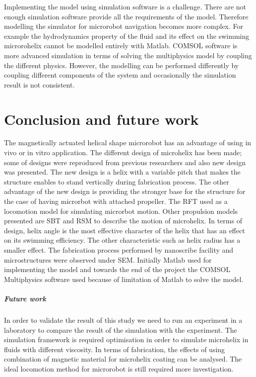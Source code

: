 \documentclass[12pt,a4paper,titlepage]{report}
\begin{document}
Implementing the model using simulation software is a challenge. There are not enough simulation 
software provide all the requirements of the model. Therefore modelling the simulator for microrobot
 navigation becomes more complex. For example the hydrodynamics property of the fluid and its 
effect on the swimming microrohelix cannot be modelled entirely with Matlab. COMSOL software 
is more advanced simulation in terms of solving the multiphysics model by coupling the different 
physics. However, the modelling can be performed differently by coupling different components 
of the system and occasionally the simulation result is not consistent.  












\chapter{Conclusion and future work}

The magnetically actuated helical shape microrobot  has an advantage of using in vivo or in 
vitro application. The different design of microhelix has been made; some of designs were 
reproduced from previous researchers and also new design was presented. The new design 
is a helix with a variable pitch that makes the structure enables to stand vertically during fabrication 
process. 
The other advantage of the new design is providing the stronger base for the structure for the case
 of having microrbot with attached propeller. The \ac*{RFT} used as a locomotion model for simulating 
microrbot motion. Other propulsion models presented are \ac*{SBT} and \ac*{RSM} to describe the 
motion of microhelix. In terms of design, helix angle is the most effective character of the helix that has 
an effect on its swimming efficiency. The other characteristic such as helix radius has a smaller effect. 
The fabrication process performed by nanoscribe facility and microstructures were observed 
under \ac*{SEM}. 
Initially Matlab used for implementing the model and towards the end of the project the 
COMSOL Multiphysics software used because of limitation of Matlab to solve the model.  



\paragraph{Future work}
In order to validate the result of this study we need to run an experiment in a laboratory 
to compare the result of the simulation with the experiment. The simulation framework is
 required optimisation in order to simulate microhelix in fluids with different viscosity. In terms 
of fabrication, the effects of using combination of magnetic material for microhelix coating can
 be analysed. The ideal locomotion method for microrobot is still required more investigation. 
\end{document}
